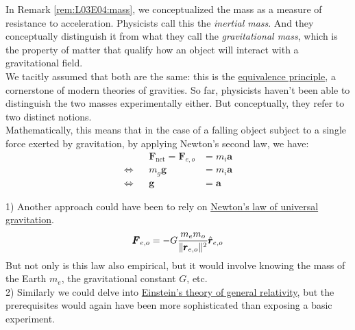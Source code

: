 \documentclass[solutions.tex]{subfiles}
\renewcommand{\bm}[1]{\pmb{#1}}
\begin{document}
\begin{remark} In Remark \ref{rem:L03E04:mass}, we conceptualized the
mass as a measure of resistance to acceleration. Physicists call
this the \textit{inertial mass}. And they conceptually distinguish
it from what they call the \textit{gravitational mass}, which
is the property of matter that qualify how an object will interact
with a gravitational field. \\

We tacitly assumed that both are the same: this is
the \href{https://en.wikipedia.org/wiki/Equivalence_principle}
{equivalence principle}, a cornerstone of modern theories
of gravities. So far, physicists haven't been able to distinguish
the two masses experimentally either. But conceptually, they refer
to two distinct notions. \\

Mathematically, this means that in the case of a falling object
subject to a single force exerted by gravitation, by applying
Newton's second law, we have:
\begin{equation*} \begin{aligned}
	~ && \bm{F}_\text{net} = \bm{F}_{e,o} &= m_i\bm{a} \\
	\Leftrightarrow && m_g\bm{g} &= m_i\bm{a} \\
	\Leftrightarrow && \bm{g} &= \bm{a}
\end{aligned} \end{equation*}

\iffalse
Incidentally, the vertical spring device that we're about to
study can be used to compute as an experimental setup to try
to measure a difference between the two masses, which we'll
present at some point later. However, to get there, we will
need to find the equation of motion for the mass attached
to the spring first.
\fi
\end{remark}

\begin{remark} 1) Another approach could have been to rely on
\href{https://en.wikipedia.org/wiki/Newton\%27s\_law\_of\_universal\_gravitation}
{Newton's law of universal gravitation}.
\[
	\bm{F}_{e,o} = -G\frac{m_e m_o}{\norm{\bm{r}_{e,o}}^2}\hat{\bm{r}}_{e,o}
\]
But not only is this law also empirical, but it would involve knowing
the mass of the Earth $m_e$, the gravitational constant $G$, etc. \\

2) Similarly we could delve into
\href{https://en.wikipedia.org/wiki/General\_relativity}
{Einstein's theory of general relativity}, but the prerequisites
would again have been more sophisticated than exposing a basic
experiment.
\end{remark}
\end{document}
